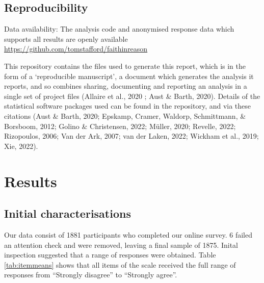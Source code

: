 \documentclass[
  ,jou,floatsintext]{apa6}
\begin{document}
\hypertarget{reproducibility}{%
\subsection{Reproducibility}\label{reproducibility}}

Data availability: The analysis code and anonymised response data which supports all results are openly available \url{https://github.com/tomstafford/faithinreason}

This repository contains the files used to generate this report, which is in the form of a `reproducible manuscript', a document which generates the analysis it reports, and so combines sharing, documenting and reporting an analysis in a single set of project files (Allaire et al., 2020 ; Aust \& Barth, 2020). Details of the statistical software packages used can be found in the repository, and via these citations (Aust \& Barth, 2020; Epskamp, Cramer, Waldorp, Schmittmann, \& Borsboom, 2012; Golino \& Christensen, 2022; Müller, 2020; Revelle, 2022; Rizopoulos, 2006; Van der Ark, 2007; van der Laken, 2022; Wickham et al., 2019; Xie, 2022).

\hypertarget{results}{%
\section{Results}\label{results}}

\hypertarget{initial-characterisations}{%
\subsection{Initial characterisations}\label{initial-characterisations}}

Our data consist of 1881 participants who completed our online survey. 6 failed an attention check and were removed, leaving a final sample of 1875. Inital inspection suggested that a range of responses were obtained. Table \ref{tab:itemmeans} shows that all items of the scale received the full range of responses from ``Strongly disagree'' to ``Strongly agree''.
\end{document}

